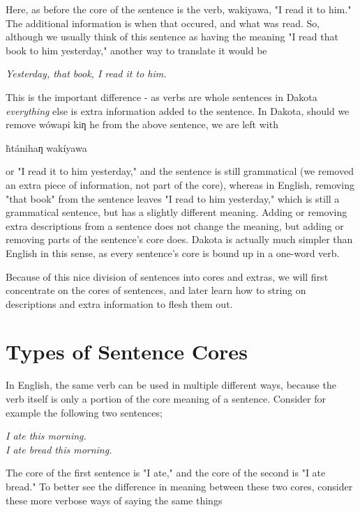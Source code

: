 \documentclass[10pt,letter]{article} %
\begin{document}
Here, as before the core of the sentence is the verb, wakiyawa, "I read it to him."  The additional information is when that occured, and what was read.  So, although we usually think of this sentence as having the meaning "I read that book to him yesterday," another way to translate it would be

\begin{center}
\emph{Yesterday, that book, I read it to him.}
\end{center}

This is the important difference - as verbs are whole sentences in Dakota \emph{everything} else is extra information added to the sentence. In Dakota, should we remove {\dak wówapi kiƞ he} from the above sentence, we are left with

\begin{center}
{\dak ḣtánihaƞ wakíyawa}
\end{center}

or "I read it to him yesterday," and the sentence is still grammatical (we removed an extra piece of information, not part of the core), whereas in English, removing "that book" from the sentence leaves "I read to him yesterday," which is still a grammatical sentence, but has a slightly different meaning.  Adding or removing extra descriptions from a sentence does not change the meaning, but adding or removing parts of the sentence's core does.  Dakota is actually much simpler than English in this sense, as every sentence's core is bound up in a one-word verb.

Because of this nice division of sentences into cores and extras, we will first concentrate on the cores of sentences, and later learn how to string on descriptions and extra information to flesh them out.


    \section{Types of Sentence Cores}

In English, the same verb can be used in multiple different ways, because the verb itself is only a portion of the core meaning of a sentence.  Consider for example the following two sentences;

\begin{center}
\emph{I ate this morning.}\\
\emph{I ate bread this morning.}
\end{center}

The core of the first sentence is "I ate," and the core of the second is "I ate bread."  To better see the difference in meaning between these two cores, consider these more verbose ways of saying the same things
\end{document}

